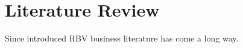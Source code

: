 \chapter{Literature Review}


Since \cite{Barney:1991} introduced \gls{RBV} business literature has come a long way. 